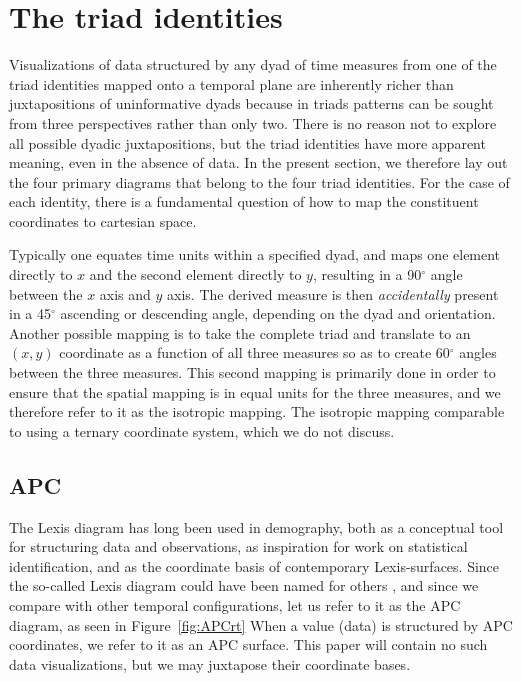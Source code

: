 \documentclass[11pt,oneside,a4paper]{article} %
\newcommand\tgh[1]{\raisebox{-.25\height}{\texttt{[image: Figures/triadtable/triad\#1.pdf]}}}
\begin{document}
\section*{The triad identities}
Visualizations of data structured by any dyad of time measures from one of
the triad identities mapped onto a temporal plane are inherently richer
than juxtapositions of uninformative dyads because in triads patterns can be
sought from three perspectives rather than only two. There is no reason not to
explore all possible dyadic juxtapositions, but the triad identities have more
apparent meaning, even in the absence of data. In the present section, we therefore lay out the four primary diagrams that belong to the four triad identities. For the case of
each identity, there is a fundamental question of how to map the constituent
coordinates to cartesian space. 

Typically one equates time units within a
specified dyad, and maps one element directly to $x$ and the second element
directly to $y$, resulting in a 90$^\circ$ angle between the $x$ axis and $y$
axis. The derived measure is then \textit{accidentally} present in a 45$^\circ$
ascending or descending angle, depending on the dyad and orientation. Another
possible mapping is to take the complete triad and translate to an
$(x,y)$ coordinate as a function of all three measures so as to create
60$^\circ$ angles between the three measures. This second mapping is primarily
done in order to ensure that the spatial mapping is in equal units for the
three measures, and we therefore refer to it as the isotropic mapping.
The isotropic mapping comparable to using a ternary coordinate system, which we
do not discuss.

\FloatBarrier
\subsection*{APC \tgh{APC}}
The Lexis diagram has long been used in demography, both as a conceptual tool
for structuring data and observations, as inspiration for work on
statistical identification, and as the coordinate basis of contemporary
Lexis-surfaces.
Since the so-called Lexis diagram could have been named for others
\citep{vandeschrick2001lexis,keiding2011age}, and since we compare with other
temporal configurations, let us refer to it as the APC diagram, as seen in
Figure~\ref{fig:APCrt}
When a value (data) is structured by APC coordinates, we refer to it as an APC
surface. This paper will contain no such data visualizations, but we may
juxtapose their coordinate bases.
\end{document}
